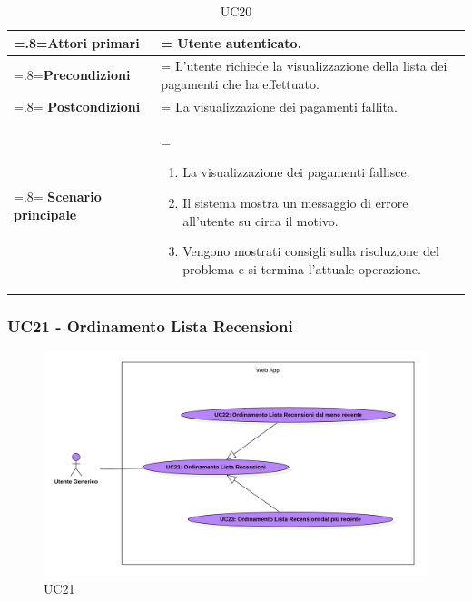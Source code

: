             \begin{table}[H]
                \centering
                \renewcommand{\arraystretch}{1.8}
                \renewcommand\tabularxcolumn[1]{m{#1}}
                \begin{tabularx}{0.9\textwidth} {
                    >{\hsize=.8\hsize\linewidth=\hsize}X
                    >{\hsize=1.2\hsize\linewidth=\hsize}X}
                    \hline
                    \textbf{Attori primari} & Utente autenticato. \\
                    \hline
                    \textbf{Precondizioni} & L'utente richiede la visualizzazione della lista dei pagamenti che ha effettuato. \\
                    \hline
                    \textbf{Postcondizioni} & La visualizzazione dei pagamenti fallita. \\
                    \hline
                    \textbf{Scenario principale} & 
                    \begin{enumerate}
                        \item La visualizzazione dei pagamenti fallisce.
                        \item Il sistema mostra un messaggio di errore all'utente su circa il motivo.
                        \item Vengono mostrati consigli sulla risoluzione del problema e si termina l'attuale operazione.
                    \end{enumerate} \\
                    \hline
                \end{tabularx}
                \caption{UC20}
            \end{table}

            \subsubsection{UC21 - Ordinamento Lista Recensioni}
            \label{UC21}

            \begin{figure}[H]
                \centering
                \includegraphics[scale=0.4]{src/img/UC21.png}
                \caption{UC21}
            \end{figure}

